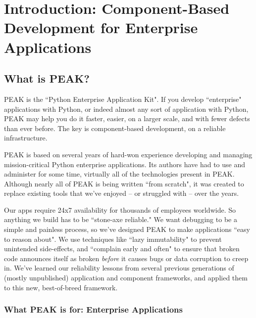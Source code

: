 \chapter{Introduction: Component-Based Development for Enterprise Applications}

\section{What is PEAK?}

PEAK is the ``Python Enterprise Application Kit". If you develop
``enterprise" applications with Python, or indeed almost any sort of
application with Python, PEAK may help you do it faster, easier, on a
larger scale, and with fewer defects than ever before. The key is
component-based development, on a reliable infrastructure.

PEAK is based on several years of hard-won experience developing and
managing mission-critical Python enterprise applications. Its authors
have had to use and administer for some time, virtually all of the
technologies present in PEAK. Although nearly all of PEAK is being
written ``from scratch", it was created to replace existing tools that
we've enjoyed -- or struggled with -- over the years.

Our apps require 24x7 availability for thousands of employees worldwide.
So anything we build has to be ``stone-axe reliable." We want debugging
to be a simple and painless process, so we've designed PEAK to make
applications ``easy to reason about". We use techniques like ``lazy
immutability" to prevent unintended side-effects, and ``complain early
and often" to ensure that broken code announces itself as broken
\emph{before} it causes bugs or data corruption to creep in.  We've learned
our reliability lessons from several previous generations of (mostly
unpublished) application and component frameworks, and applied them to
this new, best-of-breed framework.














\subsection{What PEAK is for: Enterprise Applications}

